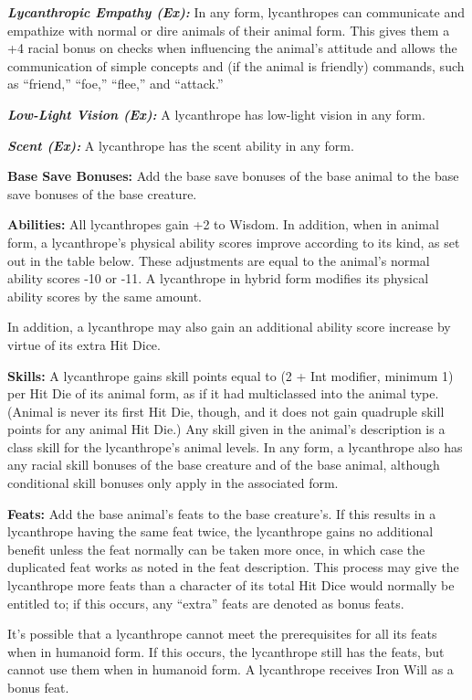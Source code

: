\documentclass{article}
\begin{document}
\textit{\textbf{Lycanthropic Empathy (Ex):}}\textit{ }In any form, lycanthropes 
can communicate and empathize with normal or dire animals of their animal form. 
This gives them a +4 racial bonus on checks when influencing the animal's attitude 
and allows the communication of simple concepts and (if the animal is friendly) 
commands, such as ``friend,'' ``foe,'' ``flee,'' and ``attack.''

\textit{\textbf{Low-Light Vision (Ex): }}A lycanthrope has low-light vision in 
any form.

\textit{\textbf{Scent (Ex): }}A lycanthrope has the scent ability in any form. 

\textbf{Base Save Bonuses:} Add the base save bonuses of the base animal to the 
base save bonuses of the base creature.

\textbf{Abilities:} All lycanthropes gain +2 to Wisdom. In addition, when in animal 
form, a lycanthrope's physical ability scores improve according to its kind, as 
set out in the table below. These adjustments are equal to the animal's normal 
ability scores -10 or -11. A lycanthrope in hybrid form modifies its physical ability 
scores by the same amount.

In addition, a lycanthrope may also gain an additional ability score increase by 
virtue of its extra Hit Dice.

\textbf{Skills:} A lycanthrope gains skill points equal to (2 + Int modifier, minimum 
1) per Hit Die of its animal form, as if it had multiclassed into the animal type. 
(Animal is never its first Hit Die, though, and it does not gain quadruple skill 
points for any animal Hit Die.) Any skill given in the animal's description is 
a class skill for the lycanthrope's animal levels. In any form, a lycanthrope also 
has any racial skill bonuses of the base creature and of the base animal, although 
conditional skill bonuses only apply in the associated form.

\textbf{Feats:} Add the base animal's feats to the base creature's. If this results 
in a lycanthrope having the same feat twice, the lycanthrope gains no additional 
benefit unless the feat normally can be taken more once, in which case the duplicated 
feat works as noted in the feat description. This process may give the lycanthrope 
more feats than a character of its total Hit Dice would normally be entitled to; 
if this occurs, any ``extra'' feats are denoted as bonus feats.

It's possible that a lycanthrope cannot meet the prerequisites for all its feats 
when in humanoid form. If this occurs, the lycanthrope still has the feats, but 
cannot use them when in humanoid form. A lycanthrope receives Iron Will as a bonus 
feat.
\end{document}
